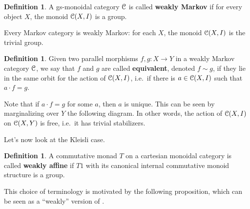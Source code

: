 \documentclass[a4paper,UKenglish,numberwithinsect,cleveref, autoref, thm-restate]{lipics-v2021}
\theoremstyle{plain} %
\theoremstyle{definition} %
\newtheorem{mydefinition}[mytheorem]{Definition}
\begin{document}
\begin{mydefinition}
 A gs-monoidal category $\mathcal{C}$ is called \textbf{weakly Markov} if for every object $X$, the monoid $\mathcal{C}(X,I)$ is a group. 
\end{mydefinition}

Every Markov category is weakly Markov: for each $X$, the monoid $\mathcal{C}(X,I)$ is the trivial group.

\begin{mydefinition}
 Given two parallel morphisms $f,g:X\to Y$ in a weakly Markov category $\mathcal{C}$, we say that $f$ and $g$ are called \textbf{equivalent}, denoted $f\sim g$, if they lie in the same orbit for the action of $\mathcal{C}(X,I)$, i.e.~if there is $a\in \mathcal{C}(X,I)$ such that $a\cdot f=g$.
\end{mydefinition}

Note that if $a\cdot f=g$ for some $a$, then $a$ is unique. This can be seen by marginalizing over $Y$ the following diagram.
In other words, the action of $\mathcal{C}(X,I)$ on $\mathcal{C}(X,Y)$ is free, i.e.~it has trivial stabilizers.



Let's now look at the Kleisli case.

\begin{mydefinition}
 A commutative monad $T$ on a cartesian monoidal category is called \textbf{weakly affine} if $T1$ with its canonical internal commutative monoid structure is a group.
\end{mydefinition}

This choice of terminology is motivated by the following proposition, which can be seen as a ``weakly'' version of .
\end{document}
